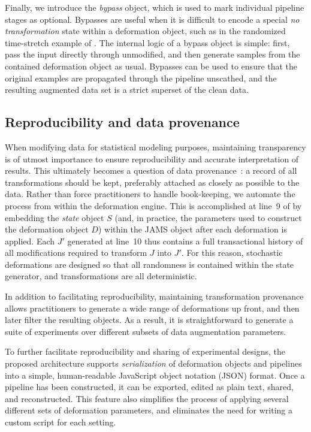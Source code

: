 \documentclass{article}
\begin{document}
Finally, we introduce the \emph{bypass} object, which is used to mark
individual pipeline stages as optional.
Bypasses are useful when it is difficult to encode a special \emph{no transformation}
state within a deformation object, such as in the randomized time-stretch 
example of .
The internal logic of a bypass object is simple: first, pass the input directly through
unmodified, and then generate samples from the contained deformation object as usual.
Bypasses can be used to ensure that the original examples are propagated through the
pipeline unscathed, and the resulting augmented data set is a strict superset of the
clean data.

\subsection{Reproducibility and data provenance}
\label{sec:reproducibility}
When modifying data for statistical modeling purposes, maintaining transparency is of
utmost importance to ensure reproducibility and accurate interpretation of results.
This ultimately becomes a question of data provenance~\cite{buneman2000data}: a record of
all transformations should be kept, preferably attached as closely as possible to the data.
Rather than force practitioners to handle book-keeping, we automate the process from within
the deformation engine.
This is accomplished at line~9 of  by embedding the
\emph{state} object $S$ (and, in practice, the parameters used to construct the
deformation object $D$) within the JAMS object after each deformation is applied.
Each $J'$ generated at line~10 thus contains a full transactional history of all
modifications required to transform $J$ into $J'$.
For this reason, stochastic deformations are designed so that all randomness is contained
within the state generator, and transformations are all deterministic.

In addition to facilitating reproducibility, maintaining transformation provenance allows
practitioners to generate a wide range of deformations up front, and then later filter the
resulting objects.  As a result, it is straightforward to generate a suite of experiments
over different subsets of data augmentation parameters.

To further facilitate reproducibility and sharing of experimental designs, the proposed
architecture supports \emph{serialization} of deformation objects and pipelines into a 
simple, human-readable JavaScript object notation (JSON) format.
Once a pipeline has been constructed, it can be exported, edited as plain text, shared,
and reconstructed.  This feature also simplifies the
process of applying several different sets of deformation parameters, and eliminates the
need for writing a custom script for each setting.
\end{document}
